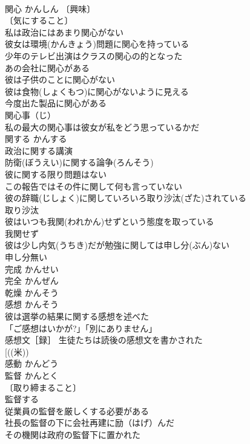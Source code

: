 \documentclass[8pt]{extreport}
\begin{document}
\begin{CJK}{UTF8}{min}
\\	関心	かんしん	〔興味〕
\\	〔気にすること〕
\\	私は政治にはあまり関心がない 
\\	彼女は環境(かんきょう)問題に関心を持っている 
\\	少年のテレビ出演はクラスの関心の的となった 
\\	あの会社に関心がある 
\\	彼は子供のことに関心がない 
\\	彼は食物(しょくもつ)に関心がないように見える 
\\	今度出た製品に関心がある 
\\	関心事（じ） 
\\	私の最大の関心事は彼女が私をどう思っているかだ 
\\	関する	かんする	
\\	政治に関する講演 
\\	防衛(ぼうえい)に関する論争(ろんそう) 
\\	彼に関する限り問題はない 
\\	この報告ではその件に関して何も言っていない 
\\	彼の辞職(じしょく)に関していろいろ取り沙汰(ざた)されている 
\\	取り沙汰　
\\	彼はいつも我関(われかん)せずという態度を取っている 
\\	我関せず 
\\	彼は少し内気(うちき)だが勉強に関しては申し分(ぶん)ない 
\\	申し分無い 
\\	完成	かんせい	
\\	完全	かんぜん	
\\	乾燥	かんそう	
\\	感想	かんそう	
\\	彼は選挙の結果に関する感想を述べた 
\\	「ご感想はいかが?」「別にありません」 
\\	感想文［録］ 生徒たちは読後の感想文を書かされた 
\\	[((米))
\\	感動	かんどう	
\\	監督	かんとく	
\\	〔取り締まること〕
\\	監督する 
\\	従業員の監督を厳しくする必要がある 
\\	社長の監督の下に会社再建に励（はげ）んだ 
\\	その機関は政府の監督下に置かれた 

\end{CJK}
\end{document}
